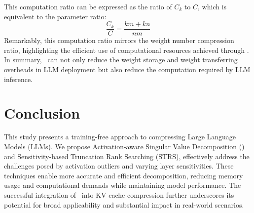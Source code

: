 This computation ratio can be expressed as the ratio of $C_k$ to $C$, which is equivalent to the parameter ratio:
\begin{equation}
    \frac{C_k}{C} = \frac{km + kn}{nm}
\end{equation}
Remarkably, this computation ratio mirrors the weight number compression ratio, highlighting the efficient use of computational resources achieved through \asvd. 
In summary, \asvd~can not only reduce the weight storage and weight transferring overheads in LLM deployment but also reduce the computation required by LLM inference. 

\section{Conclusion}
This study presents a training-free approach to compressing Large Language Models (LLMs). We propose Activation-aware Singular Value Decomposition (\asvd) and Sensitivity-based Truncation Rank Searching (STRS), effectively address the challenges posed by activation outliers and varying layer sensitivities. 
These techniques enable more accurate and efficient decomposition, reducing memory usage and computational demands while maintaining model performance. The successful integration of \asvd~into KV cache compression further underscores its potential for broad applicability and substantial impact in real-world scenarios.





